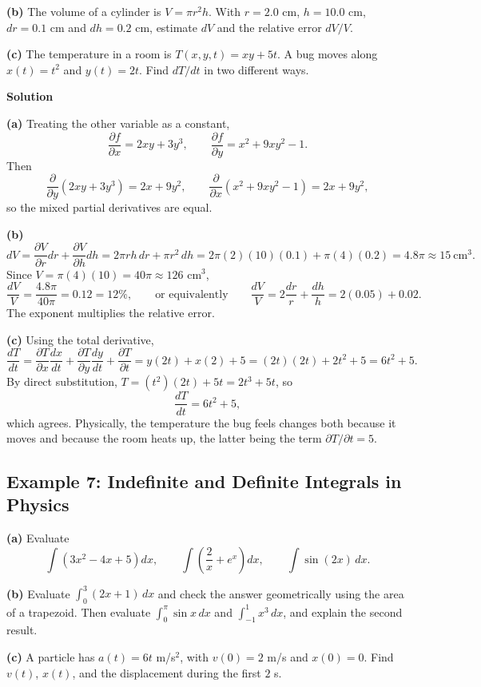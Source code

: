 \documentclass[../main.tex]{subfiles}
\begin{document}
\textbf{(b)} The volume of a cylinder is $V = \pi r^2h$. With $r = 2.0$ cm, $h = 10.0$ cm, $dr = 0.1$ cm and $dh = 0.2$ cm, estimate $dV$ and the relative error $dV/V$.

\textbf{(c)} The temperature in a room is $T(x,y,t) = xy+5t$. A bug moves along $x(t) = t^2$ and $y(t) = 2t$. Find $dT/dt$ in two different ways.

\bigskip
\textbf{Solution}

\textbf{(a)} Treating the other variable as a constant,
\[
\frac{\partial f}{\partial x} = 2xy+3y^3,
\qquad
\frac{\partial f}{\partial y} = x^2+9xy^2-1 .
\]
Then
\[
\frac{\partial}{\partial y}\left(2xy+3y^3\right) = 2x+9y^2,
\qquad
\frac{\partial}{\partial x}\left(x^2+9xy^2-1\right) = 2x+9y^2,
\]
so the mixed partial derivatives are equal.

\textbf{(b)}
\[
dV = \frac{\partial V}{\partial r}dr + \frac{\partial V}{\partial h}dh
= 2\pi r h\,dr + \pi r^2\,dh
= 2\pi(2)(10)(0.1) + \pi(4)(0.2) = 4.8\pi \approx 15\ \text{cm}^3 .
\]
Since $V = \pi(4)(10) = 40\pi \approx 126$ cm$^3$,
\[
\frac{dV}{V} = \frac{4.8\pi}{40\pi} = 0.12 = 12\%,
\qquad \text{or equivalently} \qquad
\frac{dV}{V} = 2\frac{dr}{r} + \frac{dh}{h} = 2(0.05)+0.02 .
\]
The exponent multiplies the relative error.

\textbf{(c)} Using the total derivative,
\[
\frac{dT}{dt}
= \frac{\partial T}{\partial x}\frac{dx}{dt}
+ \frac{\partial T}{\partial y}\frac{dy}{dt}
+ \frac{\partial T}{\partial t}
= y(2t) + x(2) + 5
= (2t)(2t) + 2t^2 + 5 = 6t^2+5 .
\]
By direct substitution, $T = (t^2)(2t)+5t = 2t^3+5t$, so
\[
\frac{dT}{dt} = 6t^2+5 ,
\]
which agrees. Physically, the temperature the bug feels changes both because it moves and because the room heats up, the latter being the term $\partial T/\partial t = 5$.


\subsection{Example 7: Indefinite and Definite Integrals in Physics}

\textbf{(a)} Evaluate
\[
\int\left(3x^2-4x+5\right)dx,
\qquad
\int\left(\frac{2}{x}+e^x\right)dx,
\qquad
\int \sin(2x)\,dx .
\]

\textbf{(b)} Evaluate $\int_0^3(2x+1)\,dx$ and check the answer geometrically using the area of a trapezoid. Then evaluate $\int_0^\pi \sin x\,dx$ and $\int_{-1}^{1}x^3\,dx$, and explain the second result.

\textbf{(c)} A particle has $a(t) = 6t$ m/s$^2$, with $v(0) = 2$ m/s and $x(0) = 0$. Find $v(t)$, $x(t)$, and the displacement during the first $2$ s.
\end{document}
